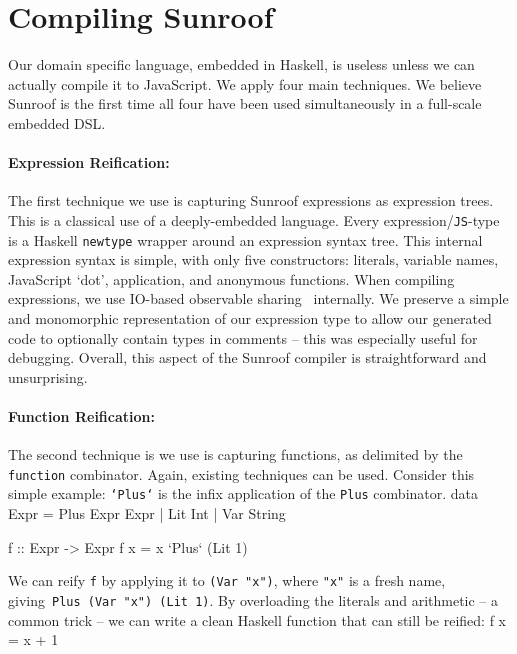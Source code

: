 \documentclass{llncs}
\newcommand{\Src}[1]{{\tt{#1}}}
\newenvironment{Code}{\verbatim}{\endverbatim}
\begin{document}

\section{Compiling Sunroof}
\label{sec:compiler}

Our domain specific language, embedded in Haskell, is useless unless
we can actually compile it to JavaScript. We apply four main techniques.
We believe Sunroof is the first time all four have been used simultaneously
in a full-scale embedded DSL.

\paragraph{Expression Reification:}
The first technique we use is capturing Sunroof expressions as expression trees. 
This is a classical use of a deeply-embedded language. Every expression/\Src{JS}-type
is a Haskell \Src{newtype} wrapper around an expression syntax tree.
This internal expression syntax is simple, with only five constructors:
literals, variable names, JavaScript `dot', application, and anonymous functions.
When compiling expressions, we use IO-based observable sharing~\cite{...} internally.
We preserve a simple and monomorphic representation of our expression
type to allow our generated code to optionally contain types in comments --
this was especially useful for debugging.
Overall, this aspect of the Sunroof compiler is straightforward and unsurprising.

\paragraph{Function Reification:}
The second technique is we use is capturing functions, as delimited
by the \Src{function} combinator. Again, existing techniques can be used.
Consider this simple example: \Src{`Plus`} is the infix application of
the \Src{Plus} combinator.
\begin{Code}
data Expr = Plus Expr Expr | Lit Int | Var String

f :: Expr -> Expr
f x = x `Plus` (Lit 1)
\end{Code}

We can reify \Src{f} by applying it to \Src{(Var "x")}, where \Src{"x"} is a fresh name,
giving~\Src{Plus (Var "x") (Lit 1)}. By overloading the literals and arithmetic -- 
a common trick -- we can write a clean Haskell function that can still be reified:
\begin{Code}
f x = x + 1
\end{Code}
\end{document}
